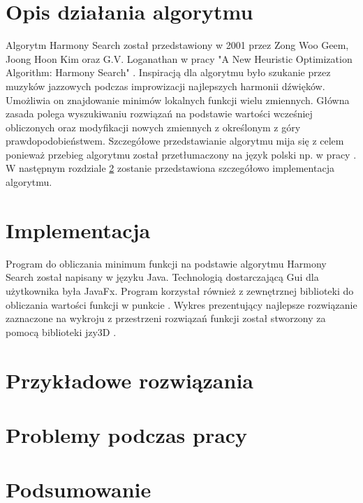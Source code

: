 \documentclass[10pt, a4paper]{article}
\begin{document}
\section{Opis działania algorytmu}
\label{sec:opis}
Algorytm Harmony Search został przedstawiony w 2001 przez Zong Woo Geem, Joong Hoon Kim oraz G.V. Loganathan w pracy "A New Heuristic Optimization Algorithm: Harmony Search" \cite{bib:orginal}. Inspiracją dla algorytmu było szukanie przez muzyków jazzowych podczas improwizacji najlepszych harmonii dźwięków. Umożliwia on znajdowanie minimów lokalnych funkcji wielu zmiennych. Główna zasada polega wyszukiwaniu rozwiązań na podstawie wartości wcześniej obliczonych oraz modyfikacji nowych zmiennych z określonym z góry prawdopodobieństwem. Szczegółowe przedstawianie algorytmu mija się z celem ponieważ przebieg algorytmu został przetłumaczony na język polski np. w pracy \cite{bib:tlumaczenie}. W następnym rozdziale \ref{sec:implementacja} zostanie przedstawiona szczegółowo implementacja algorytmu. 

\section{Implementacja}
\label{sec:implementacja}
Program do obliczania minimum funkcji na podstawie algorytmu Harmony Search został napisany w języku Java. Technologią dostarczającą Gui dla użytkownika była JavaFx. Program korzystał również z zewnętrznej biblioteki do obliczania wartości funkcji w punkcie \cite{bib:mathparser}. Wykres prezentujący najlepsze rozwiązanie zaznaczone na wykroju z przestrzeni rozwiązań funkcji został stworzony za pomocą biblioteki jzy3D \cite{bib:jzy3d}.

\section{Przykładowe rozwiązania}
\label{sec:przyklady}

\section{Problemy podczas pracy}
\label{sec:problemy}

\section{Podsumowanie}
\label{sec:podsumowanie}

\newpage



\end{document}
